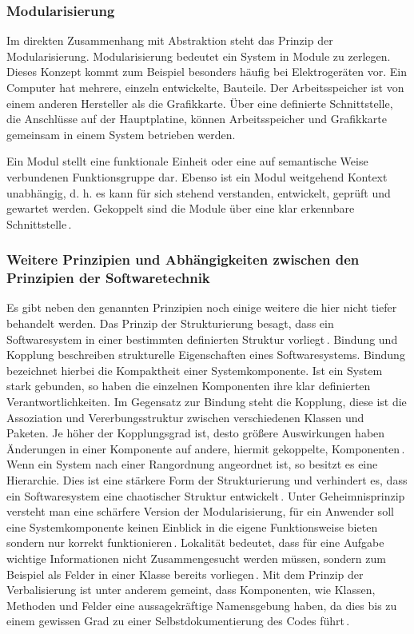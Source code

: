 \documentclass[12pt,oneside,a4paper,parskip]{scrbook}
\begin{document}
\subsubsection{Modularisierung}

Im direkten Zusammenhang mit Abstraktion steht das Prinzip der Modularisierung. Modularisierung bedeutet ein System in Module zu zerlegen. Dieses Konzept kommt zum Beispiel besonders häufig bei Elektrogeräten vor. Ein Computer hat mehrere, einzeln entwickelte, Bauteile. Der Arbeitsspeicher ist von einem anderen Hersteller als die Grafikkarte. Über eine definierte Schnittstelle, die Anschlüsse auf der Hauptplatine, können Arbeitsspeicher und Grafikkarte gemeinsam in einem System betrieben werden.

Ein Modul stellt eine funktionale Einheit oder eine auf semantische Weise verbundenen Funktionsgruppe dar. Ebenso ist ein Modul weitgehend Kontext unabhängig, d. h. es kann für sich stehend verstanden, entwickelt, geprüft und gewartet werden. Gekoppelt sind die Module über eine klar erkennbare Schnittstelle\,\cite[S. 41]{balzert2009a}.

\subsubsection{Weitere Prinzipien und Abhängigkeiten zwischen den Prinzipien der Softwaretechnik}

Es gibt neben den genannten Prinzipien noch einige weitere die hier nicht tiefer behandelt werden. Das Prinzip der Strukturierung besagt, dass ein Softwaresystem in einer bestimmten definierten Struktur vorliegt\,\cite[S. 34ff.]{balzert2009a}. Bindung und Kopplung beschreiben strukturelle Eigenschaften eines Softwaresystems. Bindung bezeichnet hierbei die Kompaktheit einer Systemkomponente. Ist ein System stark gebunden, so haben die einzelnen Komponenten ihre klar definierten Verantwortlichkeiten. Im Gegensatz zur Bindung steht die Kopplung, diese ist die Assoziation und Vererbungsstruktur zwischen verschiedenen Klassen und Paketen. Je höher der Kopplungsgrad ist, desto größere Auswirkungen haben Änderungen in einer Komponente auf andere, hiermit gekoppelte, Komponenten\,\cite[S. 37f.]{balzert2009a}. Wenn ein System nach einer Rangordnung angeordnet ist, so besitzt es eine Hierarchie. Dies ist eine stärkere Form der Strukturierung und verhindert es, dass ein Softwaresystem eine chaotischer Struktur entwickelt\,\cite[S. 39ff.]{balzert2009a}. Unter Geheimnisprinzip versteht man eine schärfere Version der Modularisierung, für ein Anwender soll eine Systemkomponente keinen Einblick in die eigene Funktionsweise bieten sondern nur korrekt funktionieren\,\cite[S. 42ff.]{balzert2009a}. Lokalität bedeutet, dass für eine Aufgabe wichtige Informationen nicht Zusammengesucht werden müssen, sondern zum Beispiel als Felder in einer Klasse bereits vorliegen\,\cite[S. 45f.]{balzert2009a}. Mit dem Prinzip der Verbalisierung ist unter anderem gemeint, dass Komponenten, wie Klassen, Methoden und Felder eine aussagekräftige Namensgebung haben, da dies bis zu einem gewissen Grad zu einer Selbstdokumentierung des Codes führt\,\cite[S. 46ff.]{balzert2009a}.
\end{document}
